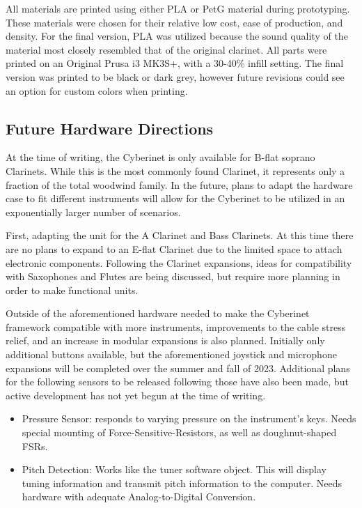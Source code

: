 All materials are printed using either PLA or PetG material during prototyping. These materials were chosen for their relative low cost, ease of production, and density. For the final version, PLA was utilized because the sound quality of the material most closely resembled that of the original clarinet. All parts were printed on an Original Prusa i3 MK3S+, with a 30-40\% infill setting. The final version was printed to be black or dark grey, however future revisions could see an option for custom colors when printing. 


\subsection{Future Hardware Directions}
At the time of writing, the Cyberinet is only available for B-flat soprano Clarinets. While this is the most commonly found Clarinet, it represents only a fraction of the total woodwind family. In the future, plans to adapt the hardware case to fit different instruments will allow for the Cyberinet to be utilized in an exponentially larger number of scenarios. 

First, adapting the unit for the A Clarinet and Bass Clarinets. At this time there are no plans to expand to an E-flat Clarinet due to the limited space to attach electronic components. Following the Clarinet expansions, ideas for compatibility with Saxophones and Flutes are being discussed, but require more planning in order to make functional units.

Outside of the aforementioned hardware needed to make the Cyberinet framework compatible with more instruments, improvements to the cable stress relief, and an increase in modular expansions is also planned. Initially only additional buttons available, but the aforementioned joystick and microphone expansions will be completed over the summer and fall of 2023. Additional plans for the following sensors to be released following those have also been made, but active development has not yet begun at the time of writing.

\begin{itemize}
    \item Pressure Sensor: responds to varying pressure on the instrument's keys. Needs special mounting of Force-Sensitive-Resistors, as well as doughnut-shaped FSRs.
    \item Pitch Detection: Works like the tuner software object. This will display tuning information and transmit pitch information to the computer. Needs hardware with adequate Analog-to-Digital Conversion.
\end{itemize}

